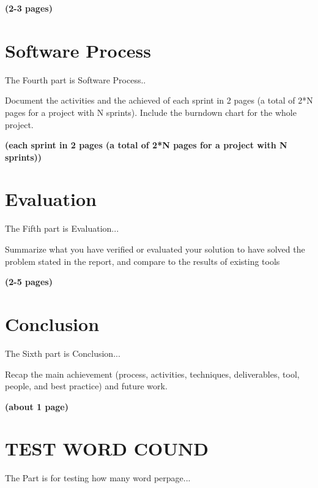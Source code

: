\documentclass[lettersize,journal]{IEEEtran}
\begin{document}
\textbf{(2-3 pages)}
 
\section{Software Process}
\noindent The Fourth part is Software Process..

Document the activities and the achieved of each sprint in 2 pages (a total of 2*N pages for a project with N sprints). Include the burndown chart for the whole project.

\textbf{(each sprint in 2 pages (a total of 2*N pages for a project with N sprints))}

\section{Evaluation}
\noindent The Fifth part is Evaluation...

Summarize what you have verified or evaluated your solution to have solved the problem stated in the report, and compare to the results of existing tools


\textbf{(2-5 pages)}


\section{Conclusion}
\noindent The Sixth part is Conclusion...

Recap the main achievement (process, activities, techniques, deliverables, tool, people, and best practice) and future work.

\textbf{(about 1 page)}


\section*{TEST WORD COUND}
\noindent The Part is for testing how many word perpage...
\end{document}
